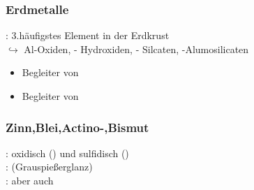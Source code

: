 \documentclass{article}
\begin{document}
\subsubsection{Erdmetalle}
: 3.häufigstes Element in der Erdkrust\\
$\hookrightarrow$ Al-Oxiden, - Hydroxiden, - Silcaten, -Alumosilicaten\\
\begin{itemize}
    \item {} Begleiter von 
    \item {} Begleiter von 
\end{itemize}

\subsubsection{Zinn,Blei,Actino-,Bismut}
: oxidisch () und sulfidisch ()\\
:  (Grauspießerglanz)\\
:  aber auch 
\end{document}
